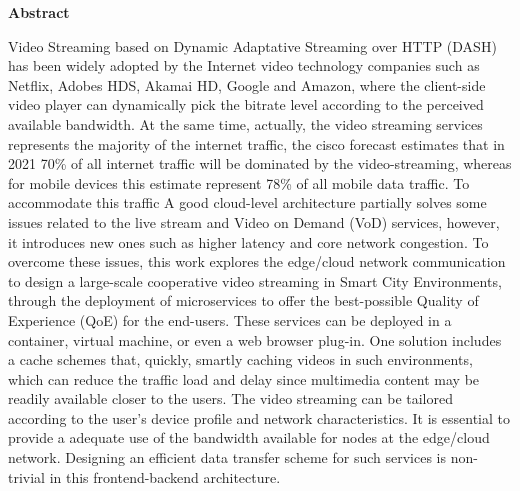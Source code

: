 \begin{center}
	{\bf Abstract}
\end{center}

Video Streaming based on Dynamic Adaptative Streaming over HTTP (DASH) has been widely adopted by the Internet video technology companies such as Netflix, Adobes HDS, Akamai HD, Google and Amazon, where the client-side video player can dynamically pick the bitrate level according to the perceived available bandwidth. 
At the same time, actually, the video streaming services represents the majority of the internet traffic, the cisco forecast estimates that in 2021 70\% of all internet traffic will be dominated by the video-streaming, whereas for mobile devices this estimate represent 78\% of all mobile data traffic. To accommodate this traffic %
A good cloud-level architecture partially solves some issues related to the live stream and Video on Demand (VoD) services, however, it introduces new ones such as higher latency and core network congestion. 
To overcome these issues, this work explores the edge/cloud network communication to design a large-scale cooperative video streaming in Smart City Environments, through the deployment of microservices to offer the best-possible Quality of Experience (QoE) for the end-users. These services can be deployed in a container, virtual machine, or even a web browser plug-in. One solution includes a cache schemes that, quickly, smartly caching videos in such environments, which can reduce the traffic load and delay since multimedia content may be readily available closer to the users. The video streaming can be tailored according to the user's device profile and network characteristics. It is essential to provide a adequate use of the bandwidth available for nodes at the edge/cloud network.%
Designing an efficient data transfer scheme for such services is non-trivial in this frontend-backend architecture.
